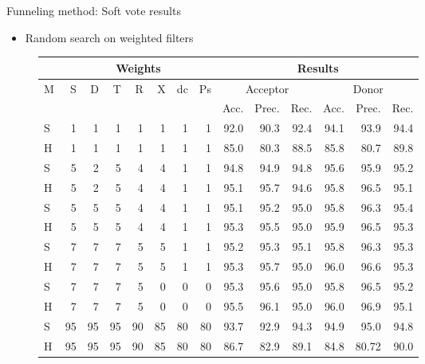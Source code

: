 \documentclass[10pt]{beamer}
\begin{document}
\begin{frame}{Funneling method: Soft vote results}
	\begin{itemize}
		\item Random search on weighted filters
	\end{itemize}
	\begin{figure}
		\scriptsize
		\centering
		\begingroup
		\def\arraystretch{1.1}
		\begin{tabular}{|l|r|r|r|r|r|r|r|r|r|r|r|r|r|}
			\hline
			& \multicolumn{7}{|c|}{Weights} & \multicolumn{6}{c|}{Results}\\
			\hline
			 M & S & D & T & R & X & dc & Ps& \multicolumn{3}{c|}{Acceptor} & \multicolumn{3}{c|}{Donor} \\
			\cline{9-14}
			&&&&&&& & Acc. & Prec. & Rec. & Acc. & Prec. & Rec. \\
			\hline
			S & 1 & 1 & 1 & 1 & 1 & 1 & 1 & 92.0 & 90.3 & 92.4 &94.1 & 93.9 & 94.4\\
			H& 1 & 1 & 1 & 1 & 1 & 1 & 1 & 85.0 & 80.3 & 88.5 & 85.8 & 80.7 & 89.8\\	
			S & 5&2&5&4&4&1&1& 94.8 & 94.9 & 94.8 & 95.6 & 95.9 & 95.2\\
			H&5&2&5&4&4&1&1&95.1 & 95.7 &94.6 & 95.8 & 96.5 & 95.1\\	
			S & 5&5&5&4&4&1&1 & 95.1 & 95.2 & 95.0 & 95.8 & 96.3 & 95.4 \\
			H & 5&5&5&4&4&1&1 & 95.3 & 95.5 & 95.0 & 95.9 & 96.5 & 95.3 \\
			S & 7&7&7&5&5&1&1 & 95.2 & 95.3 & 95.1 & 95.8 & 96.3 & 95.3 \\
			H & 7&7&7&5&5&1&1 & 95.3 & 95.7 & 95.0 & 96.0 & 96.6 & 95.3 \\
			S & 7&7&7&5&0&0&0 & 95.3 & 95.6 & 95.0 & 95.8 & 96.5 & 95.2 \\
			H & 7&7&7&5&0&0&0 & 95.5 & 96.1 & 95.0 & 96.0 & 96.9 & 95.1 \\
			S & 95&95&95&90&85&80&80 & 93.7 & 92.9 & 94.3 & 94.9 & 95.0 & 94.8 \\
			H & 95&95&95&90&85&80&80 & 86.7 & 82.9 & 89.1 & 84.8 & 80.72 & 90.0 \\
				
			\hline 
		\end{tabular}
		\endgroup
	\end{figure}
\end{frame}
\end{document}
